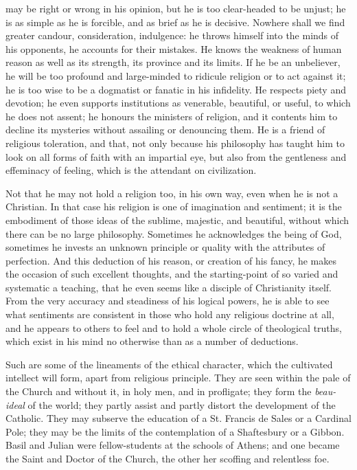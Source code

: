 may be right or wrong in his opinion, but he is too clear-headed to be
unjust; he is as simple as he is forcible, and as brief as he is
decisive. Nowhere shall we find greater candour, consideration,
indulgence: he throws himself into the minds of his opponents, he
accounts for their mistakes. He knows the weakness of human reason as
well as its strength, its province and its limits. If he be an
unbeliever, he will be too profound and large-minded to ridicule
religion or to act against it; he is too wise to be a dogmatist or
fanatic in his infidelity. He respects piety and devotion; he even
supports institutions as venerable, beautiful, or useful, to which he
does not assent; he honours the ministers of religion, and it contents
him to decline its mysteries without assailing or denouncing them. He
is a friend of religious toleration, and that, not only because his
philosophy has taught him to look on all forms of faith with an
impartial eye, but also from the gentleness and effeminacy of feeling,
which is the attendant on civilization.

Not that he may not hold a religion too, in his own way, even when
he is not a Christian. In that case his religion is one of imagination
and sentiment; it is the embodiment of those ideas of the sublime,
majestic, and beautiful, without which there can be no large
philosophy. Sometimes he acknowledges the being of God, sometimes he
invests an unknown principle or quality with the attributes of
perfection. And this deduction of his reason, or creation of his
fancy, he makes the occasion of such excellent thoughts, and the
starting-point of so varied and systematic a teaching, that he even
seems like a disciple of Christianity itself. From the very accuracy
and steadiness of his logical powers, he is able to see what
sentiments are consistent in those who hold any religious doctrine at
all, and he appears to others to feel and to hold a whole circle of
theological truths, which exist in his mind no otherwise than as a
number of deductions.

Such are some of the lineaments of the ethical character, which the
cultivated intellect will form, apart from religious principle. They
are seen within the pale of the Church and without it, in holy men,
and in profligate; they form the \emph{beau-ideal} of the world; they
partly assist and partly distort the development of the Catholic. They
may subserve the education of a St. Francis de Sales or a Cardinal
Pole; they may be the limits of the contemplation of a Shaftesbury or
a Gibbon. Basil and Julian were fellow-students at the schools of
Athens; and one became the Saint and Doctor of the Church, the other
her scoffing and relentless foe.

